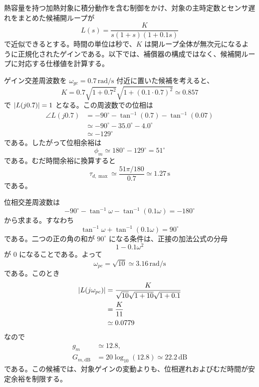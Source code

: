 \begin{example}[温度制御ループの周波数仕様]
熱容量を持つ加熱対象に積分動作を含む制御をかけ、対象の主時定数とセンサ遅れをまとめた候補開ループが
\begin{equation}
  L(s)=\frac{K}{s(1+s)(1+0.1s)}
\end{equation}
で近似できるとする。時間の単位は秒で、$K$ は開ループ全体が無次元になるように正規化されたゲインである。以下では、補償器の構成ではなく、候補開ループに対応する仕様値を計算する。

ゲイン交差周波数を $\omega_{gc}=0.7\,\mathrm{rad/s}$ 付近に置いた候補を考えると、
\begin{equation}
  K=0.7\sqrt{1+0.7^2}\sqrt{1+(0.1\cdot0.7)^2}
  \simeq 0.857
\end{equation}
で $\left|L(j0.7)\right|=1$ となる。この周波数での位相は
\begin{align}
  \angle L(j0.7)
  &=-90^\circ-\tan^{-1}(0.7)-\tan^{-1}(0.07)\\
  &\simeq -90^\circ-35.0^\circ-4.0^\circ\\
  &\simeq -129^\circ
\end{align}
である。したがって位相余裕は
\begin{equation}
  \phi_m\simeq 180^\circ-129^\circ=51^\circ
\end{equation}
である。むだ時間余裕に換算すると
\begin{equation}
  \tau_{d,\max}\simeq
  \frac{51\pi/180}{0.7}
  \simeq 1.27\,\mathrm{s}
\end{equation}
である。

位相交差周波数は
\begin{equation}
  -90^\circ-\tan^{-1}\omega-\tan^{-1}(0.1\omega)=-180^\circ
\end{equation}
から求まる。すなわち
\begin{equation}
  \tan^{-1}\omega+\tan^{-1}(0.1\omega)=90^\circ
\end{equation}
である。二つの正の角の和が $90^\circ$ になる条件は、正接の加法公式の分母
\begin{equation}
  1-0.1\omega^2
\end{equation}
が 0 になることである。よって
\begin{equation}
  \omega_{pc}=\sqrt{10}\simeq 3.16\,\mathrm{rad/s}
\end{equation}
である。このとき
\begin{align}
  \left|L(j\omega_{pc})\right|
  &=\frac{K}{\sqrt{10}\sqrt{1+10}\sqrt{1+0.1}}\\
  &=\frac{K}{11}\\
  &\simeq 0.0779
\end{align}
なので
\begin{align}
  g_m&\simeq 12.8,\\
  G_{m,\mathrm{dB}}&=20\log_{10}(12.8)\simeq 22.2\,\mathrm{dB}
\end{align}
である。この候補では、対象ゲインの変動よりも、位相遅れおよびむだ時間が安定余裕を制限する。


\end{example}
